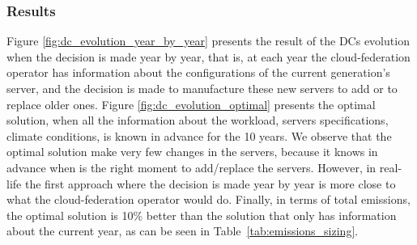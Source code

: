 \subsubsection{Results}

Figure \ref{fig:dc_evolution_year_by_year} presents the result of the DCs evolution when the decision is made year by year, that is, at each year the cloud-federation operator has information about the configurations of the current generation's server, and the decision is made to manufacture these new servers to add or to replace older ones. Figure \ref{fig:dc_evolution_optimal} presents the optimal solution, when all the information about the workload, servers specifications, climate conditions, is known in advance for the 10 years. We observe that the optimal solution make very few changes in the servers, because it knows in advance when is the right moment to add/replace the servers. However, in real-life the first approach where the decision is made year by year is more close to what the cloud-federation operator would do. Finally, in terms of total  emissions, the optimal solution is 10\% better than the solution that only has information about the current year, as can be seen in Table~\ref{tab:emissions_sizing}.

